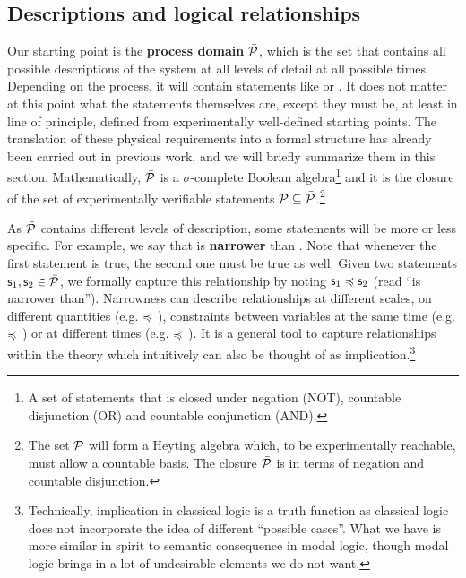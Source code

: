 \documentclass[letterpaper]{article}
\begin{document}
\subsection{Descriptions and logical relationships}

Our starting point is the \textbf{process domain} $\tdomain[P]$, which is the set that contains all possible descriptions of the system at all levels of detail at all possible times. Depending on the process, it will contain statements like  or . It does not matter at this point what the statements themselves are, except they must be, at least in line of principle, defined from experimentally well-defined starting points. The translation of these physical requirements into a formal structure has already been carried out in previous work, and we will briefly summarize them in this section. Mathematically, $\tdomain[P]$ is a $\sigma$-complete Boolean algebra\footnote{A set of statements that is closed under negation (NOT), countable disjunction (OR) and countable conjunction (AND).} and it is the closure of the set of experimentally verifiable statements $\edomain[P] \subseteq \tdomain[P]$.\footnote{The set $\edomain[P]$ will form a Heyting algebra which, to be experimentally reachable, must allow a countable basis. The closure $\tdomain[P]$ is in terms of negation and countable disjunction.}

As $\tdomain[P]$ contains different levels of description, some statements will be more or less specific. For example, we say that  is \textbf{narrower} than . Note that whenever the first statement is true, the second one must be true as well. Given two statements $\stmt_1, \stmt_2 \in \tdomain[P]$, we formally capture this relationship by noting $\stmt_1 \narrower \stmt_2$ (read ``is narrower than''). Narrowness can describe relationships at different scales, on different quantities (e.g.  $\narrower$ ), constraints between variables at the same time (e.g.  $\narrower$ ) or at different times (e.g.  $\narrower$ ). It is a general tool to capture relationships within the theory which intuitively can also be thought of as implication.\footnote{Technically, implication in classical logic is a truth function as classical logic does not incorporate the idea of different ``possible cases''. What we have is more similar in spirit to semantic consequence in modal logic, though modal logic brings in a lot of undesirable elements we do not want.}
\end{document}
